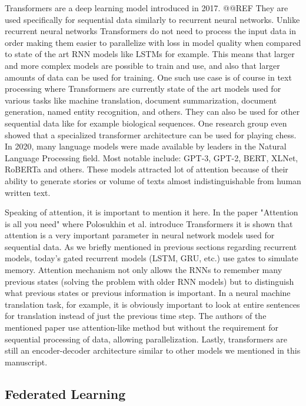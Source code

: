\documentclass[b5paper]{book}
\begin{document}
Transformers are a deep learning model introduced in 2017. @@REF They are used specifically for sequential data similarly to recurrent neural networks. Unlike recurrent neural networks Transformers do not need to process the input data in order making them easier to parallelize with loss in model quality when compared to state of the art RNN models like LSTMs for example. This means that larger and more complex models are possible to train and use, and also that larger amounts of data can be used for training. One such use case is of course in text processing where Transformers are currently state of the art models used for various tasks like machine translation, document summarization, document generation, named entity recognition, and others. They can also be used for other sequential data like for example biological sequences. One research group even showed that a specialized transformer architecture can be used for playing chess. In 2020, many language models were made available by leaders in the Natural Language Processing field. Most notable include: GPT-3, GPT-2, BERT, XLNet, RoBERTa and others. These models attracted lot of attention because of their ability to generate stories or volume of texts almost indistinguishable from human written text. 

Speaking of attention, it is important to mention it here. In the paper "Attention is all you need" where Polosukhin et al. introduce Transformers it is shown that attention is a very important parameter in neural network models used for sequential data. As we briefly mentioned in previous sections regarding recurrent models, today's gated recurrent models (LSTM, GRU, etc.) use gates to simulate memory. Attention mechanism not only allows the RNNs to remember many previous states (solving the problem with older RNN models) but to distinguish what previous states or previous information is important. In a neural machine translation task, for example, it is obviously important to look at entire sentences for translation instead of just the previous time step. The authors of the mentioned paper use attention-like method but without the requirement for sequential processing of data, allowing parallelization. Lastly, transformers are still an encoder-decoder architecture similar to other models we mentioned in this manuscript.


\subsection{Federated Learning}
\end{document}
